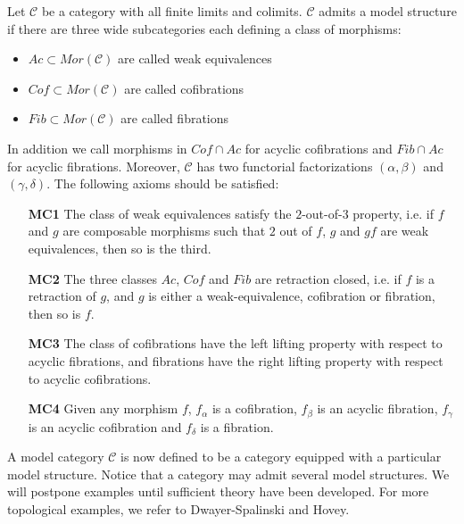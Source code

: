 \documentclass[../thesis.tex]{subfiles}
\begin{document}
            \begin{definition}
                Let $\mathcal{C}$ be a category with all finite limits and colimits. $\mathcal{C}$ admits a model structure if there are three wide subcategories each defining a class of morphisms:
                \begin{itemize}
                    \item $Ac\subset Mor(\mathcal{C})$ are called weak equivalences
                    \item $Cof\subset Mor(\mathcal{C})$ are called cofibrations
                    \item $Fib\subset Mor(\mathcal{C})$ are called fibrations
                \end{itemize}
                In addition we call morphisms in $Cof\cap Ac$ for acyclic cofibrations and $Fib\cap Ac$ for acyclic fibrations. Moreover, $\mathcal{C}$ has two functorial factorizations $(\alpha, \beta)$ and $(\gamma, \delta)$. The following axioms should be satisfied:
                \begin{itemize}
                    \item[\textbf{MC1}] The class of weak equivalences satisfy the $2$-out-of-$3$ property, i.e. if $f$ and $g$ are composable morphisms such that $2$ out of $f$, $g$ and $gf$ are weak equivalences, then so is the third.
                    \item[\textbf{MC2}] The three classes $Ac$, $Cof$ and $Fib$ are retraction closed, i.e. if $f$ is a retraction of $g$, and $g$ is either a weak-equivalence, cofibration or fibration, then so is $f$.
                    \item[\textbf{MC3}] The class of cofibrations have the left lifting property with respect to acyclic fibrations, and fibrations have the right lifting property with respect to acyclic cofibrations.
                    \item[\textbf{MC4}] Given any morphism $f$, $f_\alpha$ is a cofibration, $f_\beta$ is an acyclic fibration, $f_\gamma$ is an acyclic cofibration and $f_\delta$ is a fibration.      
                \end{itemize}
            \end{definition}

            A model category $\mathcal{C}$ is now defined to be a category equipped with a particular model structure. Notice that a category may admit several model structures. We will postpone examples until sufficient theory have been developed. For more topological examples, we refer to Dwayer-Spalinski and Hovey.
\end{document}
